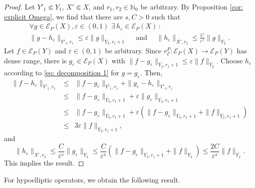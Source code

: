 \documentclass[12pt]{amsart}
\newcommand{\N}{\mathbb{N}}
\theoremstyle{definition}
\theoremstyle{remark}
\numberwithin{equation}{section}
\begin{document}
\begin{proof} 
Let $Y'_1 \Subset Y_1$, $X' \Subset X$, and  $r_1,r_2\in\N_0$ be arbitrary.
	By Proposition \ref{cor: explicit Omega}, we find that there are $s,C >0$ such that
	\begin{gather}\label{eq: decomposition 1}
		\forall g\in\mathscr{E}_P(X),\varepsilon\in (0,1)\,\,\exists\,h_\varepsilon \in\mathscr{E}_P(X) \,: \\ \nonumber
		\|g-h_\varepsilon\|_{\overline{Y'_1},r_1}\leq \varepsilon\|g\|_{\overline{Y_2},r_1+1} \quad \mbox{ and } \quad \|h_\varepsilon\|_{\overline{X'},r_2}\leq\frac{C}{\varepsilon^s}\|g\|_{\overline{Y_2}}.
	\end{gather}
	Let $f\in\mathscr{E}_P(Y)$ and $\varepsilon\in (0,1)$ be arbitrary. Since $r_{\mathscr{E}}^P:\mathscr{E}_P(X)\rightarrow\mathscr{E}_P(Y)$ has dense range, there is $g_\varepsilon\in\mathscr{E}_P(X)$ with $\|f-g_\varepsilon\|_{\overline{Y_2}, r_1+1}\leq\varepsilon\|f\|_{\overline{Y_2}}$. Choose $h_\varepsilon$ according to \eqref{eq: decomposition 1} for $g = g_\varepsilon$. Then,
	\begin{eqnarray*}
		\|f-h_\varepsilon\|_{\overline{Y'_1}, r_1}&\leq&\|f-g_\varepsilon\|_{\overline{Y'_1}, r_1}+\|g_\varepsilon-h_\varepsilon\|_{\overline{Y'_1}, r_1}\\
		&\leq&\|f-g_\varepsilon\|_{\overline{Y_2}, r_1+1}+\varepsilon \|g_\varepsilon\|_{\overline{Y_2},r_1+1} \\
		&\leq&\|f-g_\varepsilon\|_{\overline{Y_2}, r_1+1}+\varepsilon\left(\|f-g_\varepsilon\|_{\overline{Y_2}, r_1+1}+\|f\|_{\overline{Y_2}, r_1+1}\right)\\
		&\leq& 3\varepsilon\|f\|_{\overline{Y_2},r_1+1},
	\end{eqnarray*}
and
	$$\|h_\varepsilon\|_{\overline{X'},r_2}\leq\frac{C}{\varepsilon^s}\|g_\varepsilon\|_{\overline{Y_2}}\leq \frac{C}{\varepsilon^s}\left(\|f-g_\varepsilon\|_{\overline{Y_2},r_1+1}+\|f\|_{\overline{Y_2}}\right)\leq\frac{2C}{\varepsilon^s}\|f\|_{\overline{Y_2}}.$$
	This implies the result.
\end{proof}
For hypoelliptic operators, we obtain the following result.
\end{document}
